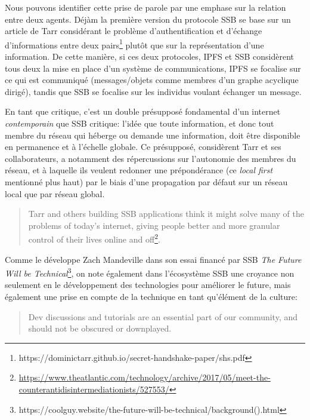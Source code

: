 \documentclass{article}
\begin{document}
Nous pouvons identifier cette prise de parole par une emphase sur la relation entre deux agents. Déjàm la premìère version du protocole SSB se base sur un article de Tarr considérant le problème d'authentification et d'échange d'informations entre deux pairs\footnote{https://dominictarr.github.io/secret-handshake-paper/shs.pdf} plutôt que sur la représentation d'une information. De cette manière, si ces deux protocoles, IPFS et SSB considèrent tous deux la mise en place d'un système de communications, IPFS se focalise sur ce qui est communiqué (messages/objets comme membres d'un graphe acyclique dirigé), tandis que SSB se focalise sur les individus voulant échanger un message.

En tant que critique, c'est un double présupposé fondamental d'un internet \emph{contemporain} que SSB critique: l'idée que toute information, et donc tout membre du réseau qui héberge ou demande une information, doit être disponible en permanence et à l'échelle globale. Ce présupposé, considèrent Tarr et ses collaborateurs, a notamment des répercussions sur l'autonomie des membres du réseau, et à laquelle ils veulent redonner une prépondérance (ce \emph{local first} mentionné plus haut) par le biais d'une propagation par défaut sur un réseau local que par réseau global.

\begin{quote}
    Tarr and others building SSB applications think it might solve many of the problems of today’s internet, giving people better and more granular control of their lives online and off\footnote{\url{https://www.theatlantic.com/technology/archive/2017/05/meet-the-counterantidisintermediationists/527553/}}.
\end{quote}

Comme le développe Zach Mandeville dans son essai financé par SSB \emph{The Future Will be Technical}\footnote{https://coolguy.website/the-future-will-be-technical/background().html}, on note également dans l'écosystème SSB une croyance non seulement en le développement des technologies pour améliorer le future, mais également une prise en compte de la technique en tant qu'élément de la culture:

\begin{quote}
    Dev discussions and tutorials are an essential part of our community, and should not be obscured or downplayed.
\end{quote}
\end{document}
